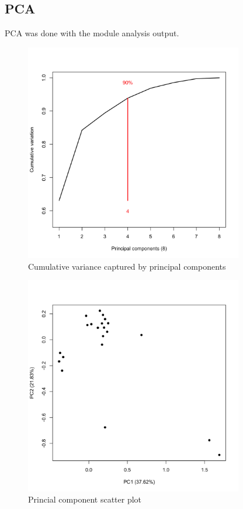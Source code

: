 \documentclass{article}
\begin{document}
\subsection*{PCA}
PCA was done with the module analysis output.\\
\begin{figure}\centering
\includegraphics[width=0.85\textwidth]{PCA/pca_var.png}
\caption{Cumulative variance captured by principal components}\label{fig:PCA/pca_var.png}\end{figure}
\begin{figure}\centering
\includegraphics[width=0.85\textwidth]{PCA/pca_plot.png}
\caption{Princial component scatter plot}\label{fig:PCA/pca_plot.png}\end{figure}
\end{document}
